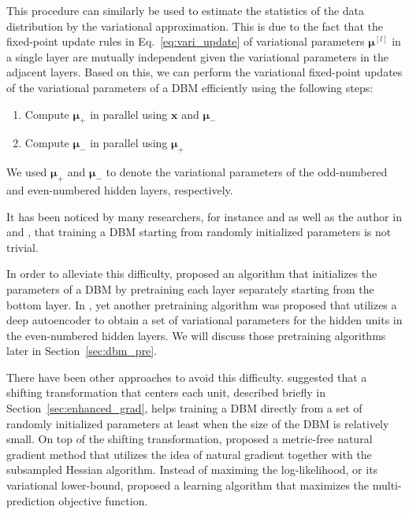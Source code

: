 \documentclass[dissertation,nocontribution]{aaltoseries}
\newcommand{\qlay}[1]{\left[#1\right]}
\newcommand{\vect}[1]{\mathbf{#1}}
\newcommand{\vects}[1]{\boldsymbol{#1}}
\newcommand{\vx}[0]{\vect{x}}
\newcommand{\vmu}[0]{\vects{\mu}}
\begin{document}
This procedure can similarly be used to estimate the
statistics of the data distribution by the variational
approximation. This is due to the fact that the fixed-point
update rules in Eq.~\eqref{eq:vari_update} of variational
parameters $\vmu^{\qlay{l}}$ in a single layer are mutually
independent given the variational parameters in the adjacent
layers. Based on this, we can perform the variational
fixed-point updates of the variational parameters of a DBM
efficiently using the following steps:
\begin{enumerate}
    \itemsep 0em
    \item Compute $\vmu_+$ in parallel using $\vx$ and $\vmu_-$
    \item Compute $\vmu_-$ in parallel using $\vmu_+$
\end{enumerate}
We used $\vmu_+$ and $\vmu_-$ to denote the variational
parameters of the odd-numbered and even-numbered hidden
layers, respectively.

It has been noticed by many researchers, for instance
\citet{Salakhutdinov2009a} and \citet{Desjardins2012} as
well as the author in  and
, that training
a DBM starting from randomly initialized parameters is not
trivial. 

In order to alleviate this difficulty,
\citet{Salakhutdinov2009a,Salakhutdinov2012} proposed an
algorithm that initializes the parameters of a DBM by
pretraining each layer separately starting from the bottom
layer. In , yet another pretraining
algorithm was proposed that utilizes a deep autoencoder to
obtain a set of variational parameters for the hidden units
in the even-numbered hidden layers.  We will discuss those
pretraining algorithms later in Section~\ref{sec:dbm_pre}.

There have been other approaches to avoid this difficulty.
\citet{Montavon2012} suggested that a shifting
transformation that centers each unit, described briefly in
Section~\ref{sec:enhanced_grad}, helps training a DBM
directly from a set of randomly initialized parameters at
least when the size of the DBM is relatively small.  On top
of the shifting transformation, \citet{Desjardins2013}
proposed a metric-free natural gradient method that utilizes
the idea of natural gradient together with the subsampled
Hessian algorithm. Instead of maximing the log-likelihood,
or its variational lower-bound, \citep{Goodfellow2013a}
proposed a learning algorithm that maximizes the
multi-prediction objective function.
\end{document}
